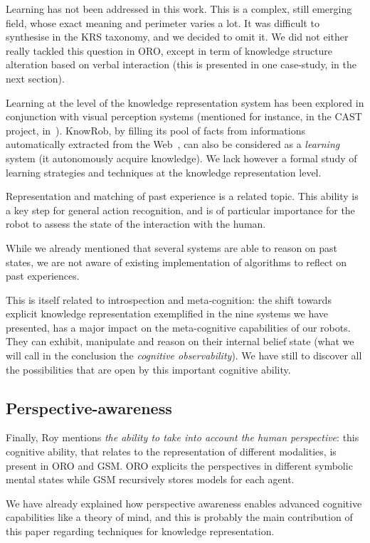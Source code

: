 \documentclass{IEEEtran}
\begin{document}
Learning has not been addressed in this work. This is a complex, still emerging
field, whose exact meaning and perimeter varies a lot. It was difficult to
synthesise in the KRS taxonomy, and we decided to omit it. We did not either
really tackled this question in ORO, except in term of knowledge structure
alteration based on verbal interaction (this is presented in one case-study, in
the next section).

Learning at the level of the knowledge representation system has been explored
in conjunction with visual perception systems (mentioned for instance, in the
CAST project, in~\cite{jacobsson2008crossmodal}). {\sc KnowRob}, by filling its pool of
facts from informations automatically extracted from the Web~\cite{Nyga2009},
can also be considered as a \emph{learning} system (it autonomously acquire
knowledge). We lack however a formal study of learning strategies and
techniques at the knowledge representation level.

Representation and matching of past experience is a related topic. This ability
is a key step for general action recognition, and is of particular importance
for the robot to assess the state of the interaction with the human.

While we already mentioned that several systems are able to reason on past
states, we are not aware of existing implementation of algorithms to reflect on
past experiences.

This is itself related to introspection and meta-cognition: the shift towards
explicit knowledge representation exemplified in the nine systems we have
presented, has a major impact on the meta-cognitive capabilities of our robots.
They can exhibit, manipulate and reason on their internal belief state (what we
will call in the conclusion the \emph{cognitive observability}). We have still
to discover all the possibilities that are open by this important cognitive
ability.

\subsection{Perspective-awareness}

Finally, Roy mentions \emph{the ability to take into account the human
perspective}: this cognitive ability, that relates to the representation of
different modalities, is present in ORO and GSM. ORO explicits the perspectives
in different symbolic mental states while GSM recursively stores models for
each agent.

We have already explained how perspective awareness enables advanced cognitive
capabilities like a theory of mind, and this is probably the main contribution
of this paper regarding techniques for knowledge representation.
\end{document}

